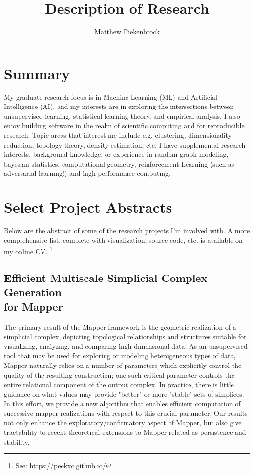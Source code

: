 \documentclass[11pt]{article}
\title{Description of Research\vspace{-2ex}}
\date{}
\author{Matthew Piekenbrock\vspace{-2ex}}
\begin{document}
\maketitle
\section*{Summary}
My graduate research focus is in Machine Learning (ML) and Artificial Intelligence (AI), and my interests are in exploring the intersections between unsupervised learning, statistical learning theory, and empirical analysis. I also enjoy building software in the realm of scientific computing and for reproducible research. Topic areas that interest me include e.g. clustering, dimensionality reduction, topology theory, density estimation, etc. I have supplemental research interests, background knowledge, or experience in random graph modeling, bayesian statistics, computational geometry, reinforcement Learning (such as adversarial learning!) and high performance computing.

\section*{Select Project Abstracts}
Below are the abstract of some of the research projects I'm involved with. A more comprehensive list, complete with visualization, source code, etc. is available on my online CV.
\footnote{See: \url{https://peekxc.github.io/}}

\subsection{Efficient Multiscale Simplicial Complex Generation \\for Mapper}
The primary result of the Mapper framework is the geometric realization of a simplicial complex, depicting topological relationships and structures suitable for visualizing, analyzing, and comparing high dimensional data. As an unsupervised tool that may be used for exploring or modeling heterogeneous types of data, Mapper naturally relies on a number of parameters which explicitly control the quality of the resulting construction; one such critical parameter controls the entire relational component of the output complex. In practice, there is little guidance on what values may provide "better" or more "stable" sets of simplices. In this effort, we provide a new algorithm that enables efficient computation of successive mapper realizations with respect to this crucial parameter. Our results not only enhance the exploratory/confirmatory aspect of Mapper, but also give tractability to recent theoretical extensions to Mapper related as persistence and stability.
\end{document}
